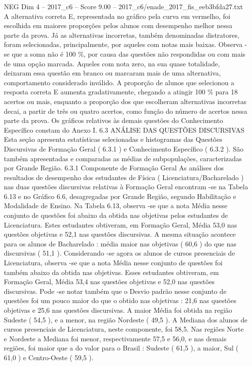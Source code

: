 \begin{textsample}{NEG Dim 4 – 2017\_c6 – Score 9.00 – 2017\_c6/enade\_2017\_fis\_eeb3bfda27.txt}
A alternativa correta E, representada no gráfico pela curva em vermelho, foi escolhida em maiores proporções pelos alunos com desempenho melhor nessa parte da prova.
Já as alternativas incorretas, também denominadas distratores, foram selecionadas, principalmente, por aqueles com notas mais baixas.
Observa -se que a soma não é 100 \%, por causa das questões não respondidas ou com mais de uma opção marcada.
Aqueles com nota zero, na sua quase totalidade, deixaram essa questão em branco ou marcaram mais de uma alternativa, comportamento considerado inválido.
A proporção de alunos que selecionou a resposta correta E aumenta gradativamente, chegando a atingir 100 \% para 18 acertos ou mais, enquanto a proporção dos que escolheram alternativas incorretas decai, a partir de três ou quatro acertos, como função do número de acertos nessa parte da prova.
Os gráficos relativos às demais questões do Conhecimento Específico constam do Anexo I. 6.3 ANÁLISE DAS QUESTÕES DISCURSIVAS Esta seção apresenta estatísticas selecionadas e histogramas das Questões Discursivas de Formação Geral ( 6.3.1 ) e Conhecimento Específico ( 6.3.2 ).
São também apresentadas e comparadas as médias de subpopulações, caracterizadas por Grande Região. 6.3.1 Componente de Formação Geral As análises dos resultados de desempenho dos estudantes de Física ( Licenciatura/Bacharelado ) nas duas questões discursivas relativas à Formação Geral encontram -se na Tabela 6.13 e no Gráfico 6.6, desagregadas por Grande Região, segundo Habilitação e Modalidade de Ensino.
Na Tabela 6.13, observa -se que a nota Média nesse conjunto de questões foi abaixo da obtida nas objetivas pelos estudantes de Licenciatura.
Estes estudantes obtiveram, em Formação Geral, Média 53,0 nas questões objetivas e 52,1 nas questões discursivas.
A mesma situação acontece para os alunos de Bacharelado : média maior nas objetivas ( 60,6 ) do que nas discursivas ( 51,1 ).
Considerando -se agora os alunos de cursos presenciais de Licenciatura, observa -se que a nota Média nesse conjunto de questões foi também abaixo da obtida nas objetivas.
Esses estudantes obtiveram, em Formação Geral, Média 53,4 nas questões objetivas e 52,0 nas questões discursivas.
Pode -se notar também que o Desvio padrão nesse conjunto de questões foi um pouco maior do que o obtido nas objetivas : 21,6 nas questões objetivas e 25,6 nas questões discursivas.
A maior Média foi obtida na região Sudeste ( 54,5 ), e a menor, na região Nordeste ( 49,5 ).
A Mediana dos alunos de cursos presenciais de Licenciatura, neste componente, foi 58,5.
Nas regiões Norte e Nordeste a Mediana foi menor, respectivamente 57,5 e 56,0, e nas demais regiões, foi maior que a do valor para o Brasil : Sudeste ( 61,5 ), a maior, Sul ( 61,0 ) e Centro-Oeste ( 59,5 ).

\end{textsample}
